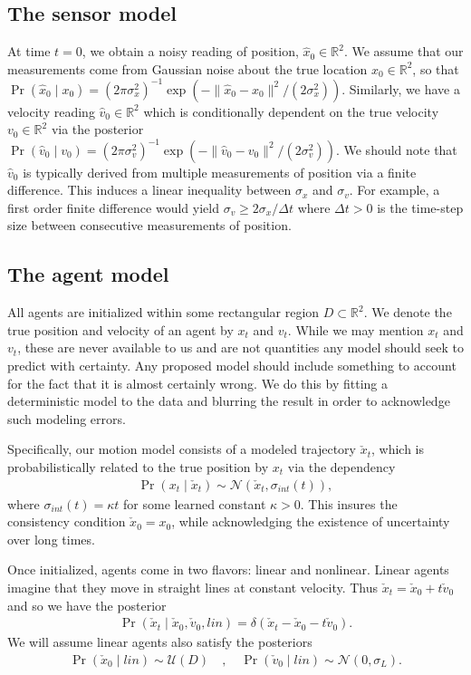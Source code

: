 \documentclass[conference]{IEEEtran}
\begin{document}
\subsection{The sensor model}
At time $t=0$, we obtain a noisy reading of position, $\hat{x}_0 \in \mathbb{R}^2$.
We assume that our measurements come from Gaussian noise about the true location $x_0 \in \mathbb{R}^2$,
so that $\Pr(\hat{x}_0 \mid x_0 ) = (2\pi \sigma_x^2)^{-1} \exp( - \| \hat{x}_0 - x_0 \|^2 / (2 \sigma_x^2) )$.
Similarly, we have a velocity reading $\hat{v}_0 \in \mathbb{R}^2$ which is conditionally dependent on the true velocity $v_0 \in \mathbb{R}^2$
via the posterior $\Pr( \hat{v}_0 \mid v_0 ) = (2\pi \sigma_v^2)^{-1} \exp( - \| \hat{v}_0 - v_0 \|^2 / (2 \sigma_v^2) )$.
We should note that $\hat{v}_0$ is typically derived from multiple measurements of position via a finite difference.
This induces a linear inequality between $\sigma_x$ and $\sigma_v$.
For example, a first order finite difference would yield $\sigma_v \geq 2 \sigma_x / \Delta t$ where $\Delta t > 0$ is the time-step size between consecutive measurements of position.

\subsection{The agent model}
All agents are initialized within some rectangular region $D \subset \mathbb{R}^2$.
We denote the true position and velocity of an agent by $x_t$ and $v_t$.
While we may mention $x_t$ and $v_t$, these are never available to us and are not quantities any model should seek to predict with certainty.
Any proposed model should include something to account for the fact that it is almost certainly wrong.
We do this by fitting a deterministic model to the data and blurring the result in order to acknowledge such modeling errors.

Specifically, our motion model consists of a modeled trajectory $\check{x}_t$, which is probabilistically related to the true position by $x_t$ via the dependency
\begin{align*}
	\Pr( x_t \mid \check{x}_t ) \sim \mathcal{N}( \check{x}_t, \sigma_{int}(t)),
\end{align*}
where $\sigma_{int}(t) = \kappa t$ for some learned constant $\kappa > 0$.
This insures the consistency condition $\check{x}_0 = x_0$, while acknowledging the existence of uncertainty over long times.

Once initialized, agents come in two flavors: linear and nonlinear.
Linear agents imagine that they move in straight lines at constant velocity.
Thus $\check{x}_t = \check{x}_0 + t \check{v}_0$ and so we have the posterior
\begin{align*}
	\Pr( \check{x}_t \mid \check{x}_0, \check{v}_0, lin) = \delta( \check{x}_t - \check{x}_0 - t \check{v}_0 ).
\end{align*}
We will assume linear agents also satisfy the posteriors
\begin{align*}
	\Pr( \check{x}_0 \mid lin ) \sim \mathcal{U}( D)\quad,\quad \Pr( \check{v}_0 \mid lin ) \sim \mathcal{N}( 0 , \sigma_L).
\end{align*}
\end{document}
